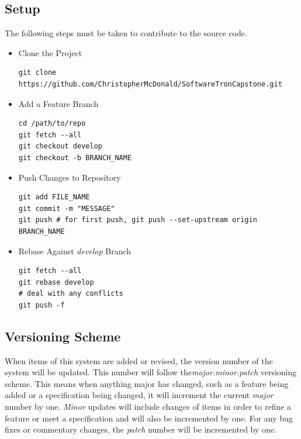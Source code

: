 \documentclass[11pt]{article}
\begin{document}
\subsection{Setup}
The following steps must be taken to contribute to the source code.
\begin{itemize}

\item Clone the Project
\begin{verbatim}
git clone https://github.com/ChristopherMcDonald/SoftwareTronCapstone.git
\end{verbatim}

\item Add a Feature Branch
\begin{verbatim}
cd /path/to/repo
git fetch --all
git checkout develop
git checkout -b BRANCH_NAME
\end{verbatim}

\item Push Changes to Repository
\begin{verbatim}
git add FILE_NAME
git commit -m "MESSAGE"
git push # for first push, git push --set-upstream origin BRANCH_NAME
\end{verbatim}

\item Rebase Against \textit{develop} Branch
\begin{verbatim}
git fetch --all
git rebase develop
# deal with any conflicts
git push -f
\end{verbatim}

\end{itemize}

\subsection{Versioning Scheme}
When items of this system are added or revised, the version number of the system will be updated. This number will follow the\textit{major.minor.patch} versioning scheme. This means when anything major has changed, such as a feature being added or a specification being changed, it will increment the current \textit{major} number by one. \textit{Minor} updates will include changes of items in order to refine a feature or meet a specification and will also be incremented by one. For any bug fixes or commentary changes, the \textit{patch} number will be incremented by one.
\end{document}
